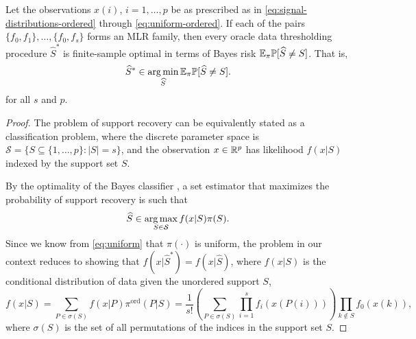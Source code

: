 \begin{proposition} \label{prop:optimal-oracle-procedures}
Let the observations $x(i)$, $i=1,\ldots,p$ be as prescribed as in \eqref{eq:signal-distributions-ordered} through \eqref{eq:uniform-ordered}.
If each of the pairs $\{f_0, f_{1}\},\ldots,\{f_0,f_{s}\}$ forms an MLR family, then every oracle data thresholding procedure $\widehat{S}^*$ is finite-sample optimal in terms of Bayes risk ${\mathbb E}_\pi {\mathbb P}[\widehat{S} \neq S]$. That is,
\begin{equation} \label{eq:finite-sample-Bayes-optimal}
    \widehat{S}^* \in \operatorname*{arg\,min}_{\widehat{S}} {\mathbb E}_\pi {\mathbb P}[\widehat{S} \neq S].
\end{equation}
for all $s$ and $p$.
\end{proposition} 
\begin{proof}%
The problem of support recovery can be equivalently stated as a classification problem, where the discrete parameter space is $\mathcal{S} = \{S\subseteq\{1,\ldots,p\}:|S|=s\}$, and the observation $x \in\mathbb R^p$ has likelihood $f(x|S)$ indexed by the support set $S$.

By the optimality of the Bayes classifier \citep[see, e.g.,][]{domingos1997optimality}, a set estimator that maximizes the probability of support recovery is such that
$$
\widehat{S} \in \operatorname*{arg\,max}_{S\in \mathcal{S}} f(x|S) \pi(S).
$$
Since we know from \eqref{eq:uniform} that $\pi(\cdot)$ is uniform, the problem in our context reduces to showing that $f(x|\widehat{S}^*) = f(x|\widehat{S})$, where $f(x|S)$ is the conditional distribution of data given the unordered support $S$,
$$
f(x|S) 
= \sum_{P\in\sigma(S)} f(x|P) \pi^{\text{ord}}(P|S) 
= \frac{1}{s!} \left(\sum_{P\in\sigma{(S)}} \prod_{i=1}^s {f_{i}(x(P(i)))}\right) \prod_{k\not\in S}{f_0(x(k))},
$$
where $\sigma(S)$ is the set of all permutations of the indices in the support set $S$.


\end{proof}
